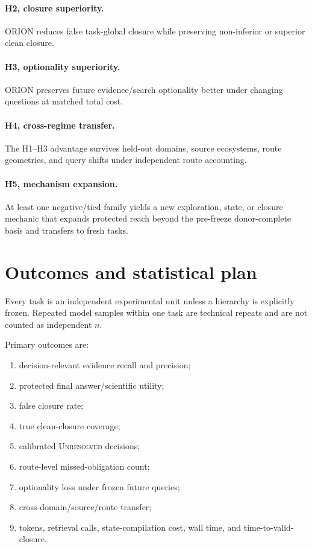 \documentclass[11pt]{article}
\begin{document}
\paragraph{H2, closure superiority.}
ORION reduces false task-global closure while preserving non-inferior or superior clean closure.

\paragraph{H3, optionality superiority.}
ORION preserves future evidence/search optionality better under changing questions at matched total cost.

\paragraph{H4, cross-regime transfer.}
The H1--H3 advantage survives held-out domains, source ecosystems, route geometries, and query shifts under independent route accounting.

\paragraph{H5, mechanism expansion.}
At least one negative/tied family yields a new exploration, state, or closure mechanic that expands protected reach beyond the pre-freeze donor-complete basis and transfers to fresh tasks.

\section{Outcomes and statistical plan}
Every task is an independent experimental unit unless a hierarchy is explicitly frozen. Repeated model samples within one task are technical repeats and are not counted as independent $n$.

Primary outcomes are:
\begin{enumerate}
    \item decision-relevant evidence recall and precision;
    \item protected final answer/scientific utility;
    \item false closure rate;
    \item true clean-closure coverage;
    \item calibrated \textsc{Unresolved} decisions;
    \item route-level missed-obligation count;
    \item optionality loss under frozen future queries;
    \item cross-domain/source/route transfer;
    \item tokens, retrieval calls, state-compilation cost, wall time, and time-to-valid-closure.
\end{enumerate}
\end{document}
